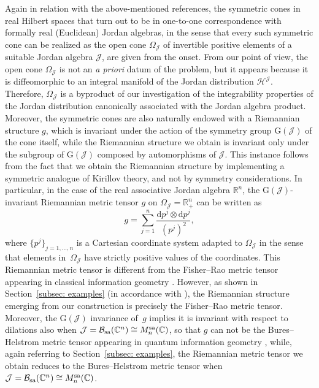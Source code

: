 \documentclass[10pt,a4paper]{amsart}
\numberwithin{equation}{section}
\newcommand{\hh}{\mathcal{H}}
\newcommand{\Jcal}{\mathcal{J}}
\newcommand{\G}{\mathrm{G}}
\begin{document}
Again in relation with the above-mentioned references, the symmetric cones in real Hilbert spaces that turn out to be in one-to-one correspondence with formally real (Euclidean) Jordan algebras, in the sense that every such symmetric cone can be realized as the open cone $\Omega_\Jcal$ of invertible positive elements of a suitable Jordan algebra $\Jcal$, are given from the onset.
From our point of view, the open cone $\Omega_\Jcal$ is not an {\itshape a priori} datum of the problem, but it appears because it is diffeomorphic to an integral manifold of the Jordan distribution $\hh^\Jcal$.
Therefore, $\Omega_\Jcal$ is a byproduct of our investigation of the integrability properties of the Jordan distribution canonically associated with the Jordan algebra product.
Moreover, the symmetric cones are also naturally endowed with a Riemannian structure $g$, which is invariant under the action of the symmetry group $\G(\Jcal)$ of the cone itself, while the Riemannian structure we obtain is invariant only under the subgroup of $\G(\Jcal)$ composed by automorphisms of $\Jcal$.
This instance follows from the fact that we obtain the Riemannian structure by implementing a symmetric analogue of Kirillov theory, and not by symmetry considerations.
In particular, in the case of the real associative Jordan algebra $\mathbb{R}^{n}$, the $\G(\Jcal)$-invariant Riemannian metric tensor $g$ on $\Omega_\Jcal=\mathbb{R}^{n}_{+}$ can be written as \cite[Theorem~2.3.19]{Chu-2012}
\[
g=\sum_{j=1}^{n}\frac{\mathrm{d}p^{j} \otimes \mathrm{d}p^{j}}{(p^{j})^{2}},
\]
where $\{p^{j}\}_{j=1,\dots,n}$ is a Cartesian coordinate system adapted to $\Omega_\Jcal$ in the sense that elements in~$\Omega_\Jcal$ have strictly positive values of the coordinates.
This Riemannian metric tensor is different from the Fisher--Rao metric tensor appearing in classical information geometry \cite{A-J-L-S-2017}.
However, as shown in Section~\ref{subsec: examples} (in accordance with \cite{C-J-S-2020}), the Riemannian structure emerging from our construction is precisely the Fisher--Rao metric tensor.
Moreover, the $\G(\Jcal)$ invariance of~$g$ implies it is invariant with respect to dilations also when $\Jcal = \mathcal{B}_{\rm sa}(\mathbb{C}^{n})\cong M_{n}^{\rm sa}(\mathbb{C})$, so that $g$ can not be the Bures--Helstrom metric tensor appearing in quantum information geometry \cite{Dittmann-1993}, while, again referring to Section~\ref{subsec: examples}, the Riemannian metric tensor we obtain reduces to the Bures--Helstrom metric tensor when $\Jcal = \mathcal{B}_{\rm sa}(\mathbb{C}^{n})\cong M_{n}^{\rm sa}(\mathbb{C})$.
\end{document}

